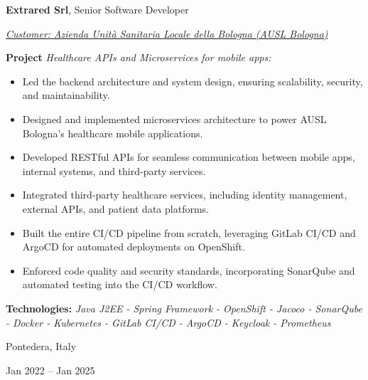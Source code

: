 \documentclass[10pt, a4paper]{article}
\newenvironment{highlights}{
    \begin{itemize}[
        topsep=0.10 cm,
        parsep=0.10 cm,
        partopsep=0pt,
        itemsep=0pt,
        leftmargin=0.4 cm + 10pt
    ]
}{
    \end{itemize}
} %
\newenvironment{twocolentry}[2][]{
    \onecolentry
    \def\secondColumn{#2}
    \setcolumnwidth{\fill, 4.5 cm}
    \begin{paracol}{2}
}{
    \switchcolumn \raggedleft \secondColumn
    \end{paracol}
    \endonecolentry
} %
\begin{document}
        \begin{twocolentry}{
            \fontsize{14}{18}Pontedera, Italy

        Jan 2022 – Jan 2025
            \normalsize
        }
            \fontsize{12}{16}
            \textcolor{secondaryColor}{\faBriefcase\hspace{4pt}\textbf{Extrared Srl},} Senior Software Developer
            \normalsize

            \vspace{0.10 cm}
                \vspace{0.10 cm}

                \textcolor{tertiaryColor}{\faAngleDoubleRight\hspace{0.1cm}\underline{\textit{Customer:} \textit{Azienda Unità Sanitaria Locale della Bologna (AUSL Bologna)}}}

                \vspace{0.2cm}
                \textbf{Project \faAngleRight} \textit{Healthcare APIs and Microservices for mobile apps:}

                \begin{highlights}
                        \item Led the backend architecture and system design, ensuring scalability, security, and maintainability.
                        \item Designed and implemented microservices architecture to power AUSL Bologna's healthcare mobile applications.
                        \item Developed RESTful APIs for seamless communication between mobile apps, internal systems, and third-party services.
                        \item Integrated third-party healthcare services, including identity management, external APIs, and patient data platforms.
                        \item Built the entire CI/CD pipeline from scratch, leveraging GitLab CI/CD and ArgoCD for automated deployments on OpenShift.
                        \item Enforced code quality and security standards, incorporating SonarQube and automated testing into the CI/CD workflow.
                \end{highlights}
                \faBuffer
                \textbf{ Technologies:} \textit{Java J2EE - Spring Framework - OpenShift - Jacoco - SonarQube - Docker - Kubernetes - GitLab CI/CD - ArgoCD - Keycloak - Prometheus}


\end{twocolentry}
\end{document}
